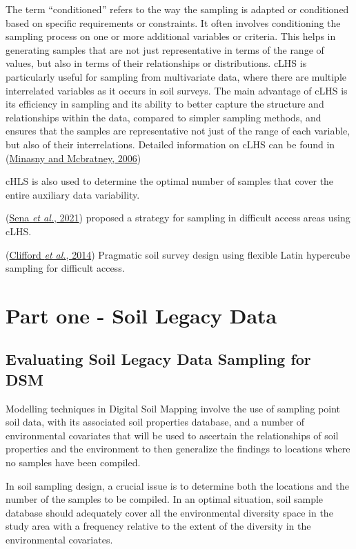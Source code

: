 \documentclass[
]{book}
\begin{document}
The term ``conditioned'' refers to the way the sampling is adapted or conditioned based on specific requirements or constraints. It often involves conditioning the sampling process on one or more additional variables or criteria. This helps in generating samples that are not just representative in terms of the range of values, but also in terms of their relationships or distributions. cLHS is particularly useful for sampling from multivariate data, where there are multiple interrelated variables as it occurs in soil surveys. The main advantage of cLHS is its efficiency in sampling and its ability to better capture the structure and relationships within the data, compared to simpler sampling methods, and ensures that the samples are representative not just of the range of each variable, but also of their interrelations. Detailed information on cLHS can be found in (\protect\hyperlink{ref-minasny2006}{Minasny and Mcbratney, 2006})

cHLS is also used to determine the optimal number of samples that cover the entire auxiliary data variability.

(\protect\hyperlink{ref-SENA2021e00354}{Sena \emph{et al.}, 2021}) proposed a strategy for sampling in difficult access areas using cLHS.

(\protect\hyperlink{ref-CLIFFORD201462}{Clifford \emph{et al.}, 2014}) Pragmatic soil survey design using flexible Latin hypercube sampling for difficult access.

\hypertarget{part-part-one---soil-legacy-data}{%
\part*{Part one - Soil Legacy Data}\label{part-part-one---soil-legacy-data}}

\hypertarget{legacy_data}{%
\chapter{Evaluating Soil Legacy Data Sampling for DSM}\label{legacy_data}}

Modelling techniques in Digital Soil Mapping involve the use of sampling point soil data, with its associated soil properties database, and a number of environmental covariates that will be used to ascertain the relationships of soil properties and the environment to then generalize the findings to locations where no samples have been compiled.

In soil sampling design, a crucial issue is to determine both the locations and the number of the samples to be compiled. In an optimal situation, soil sample database should adequately cover all the environmental diversity space in the study area with a frequency relative to the extent of the diversity in the environmental covariates.
\end{document}
